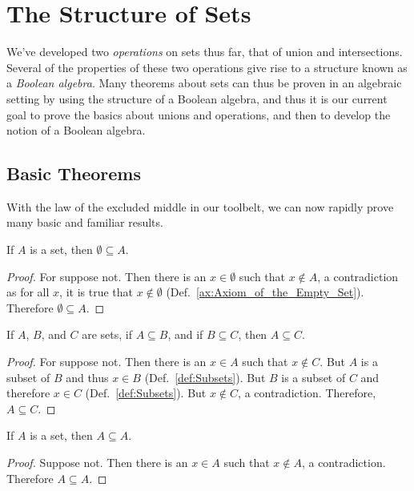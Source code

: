 \section{The Structure of Sets}
    We've developed two \textit{operations} on sets thus far, that of union and
    intersections. Several of the properties of these two operations give rise
    to a structure known as a \textit{Boolean algebra}. Many theorems about sets
    can thus be proven in an algebraic setting by using the structure of a
    Boolean algebra, and thus it is our current goal to prove the basics about
    unions and operations, and then to develop the notion of a Boolean algebra.
    \subsection{Basic Theorems}
        With the law of the excluded middle in our toolbelt, we can now rapidly
        prove many basic and familiar results.
        \begin{theorem}
            \label{thm:Emptyset_Is_Subset}%
            If $A$ is a set, then $\emptyset\subseteq{A}$.
        \end{theorem}
        \begin{proof}
            For suppose not. Then there is an $x\in\emptyset$ such that
            $x\notin{A}$, a contradiction as for all $x$, it is true that
            $x\notin\emptyset$ (Def.~\ref{ax:Axiom_of_the_Empty_Set}).
            Therefore $\emptyset\subseteq{A}$.
        \end{proof}
        \begin{theorem}
            \label{thm:Subset_is_Transitive}%
            If $A$, $B$, and $C$ are sets, if $A\subseteq{B}$, and if
            $B\subseteq{C}$, then $A\subseteq{C}$.
        \end{theorem}
        \begin{proof}
            For suppose not. Then there is an $x\in{A}$ such that $x\notin{C}$.
            But $A$ is a subset of $B$ and thus $x\in{B}$
            (Def.~\ref{def:Subsets}). But $B$ is a subset of $C$ and therefore
            $x\in{C}$ (Def.~\ref{def:Subsets}). But $x\notin{C}$, a
            contradiction. Therefore, $A\subseteq{C}$.
        \end{proof}
        \begin{theorem}
            \label{thm:Set_Is_Subset_Of_Self}%
            If $A$ is a set, then $A\subseteq{A}$.
        \end{theorem}
        \begin{proof}
            Suppose not. Then there is an $x\in{A}$ such that $x\notin{A}$, a
            contradiction. Therefore $A\subseteq{A}$.
        \end{proof}
